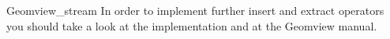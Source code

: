 \begin{ccRefClass}{Geomview_stream}
In order to implement further insert and extract operators you should
take a look at the implementation and at the Geomview manual.








\end{ccRefClass}


